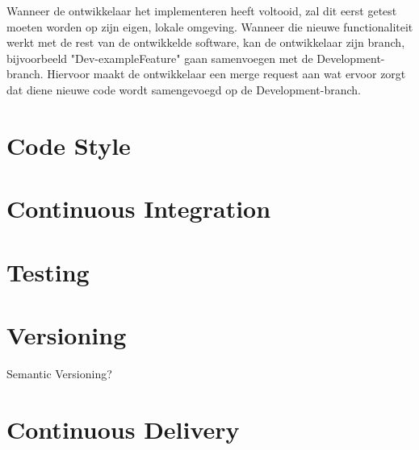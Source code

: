 \documentclass{article}
\begin{document}
	
	Wanneer de ontwikkelaar het implementeren heeft voltooid, zal dit eerst getest moeten worden op zijn eigen, lokale omgeving. Wanneer die nieuwe functionaliteit werkt met de rest van de ontwikkelde software, kan de ontwikkelaar zijn branch, bijvoorbeeld "Dev-exampleFeature" gaan samenvoegen met de Development-branch. Hiervoor maakt de ontwikkelaar een merge request aan wat ervoor zorgt dat diene nieuwe code wordt samengevoegd op de Development-branch.

	
	\section{Code Style}
	
	\section{Continuous Integration} 	
	\section{Testing}
	\section{Versioning}
	Semantic Versioning?
	\section{Continuous Delivery}
\end{document}

